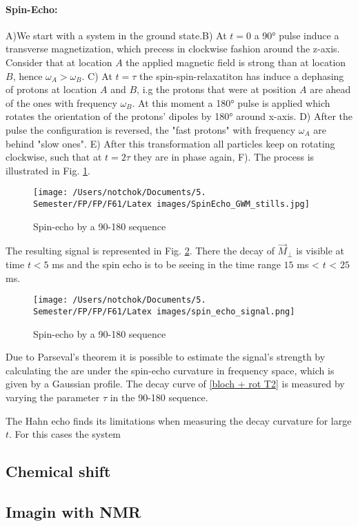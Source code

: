 \paragraph{Spin-Echo:}
A)We start with a system in the ground state.B) At $t = 0$ a 90° pulse induce a transverse magnetization, which precess in clockwise fashion around the z-axis. Consider that at location $A$ the applied magnetic field is strong than at location $B$, hence $\omega_A > \omega_B$. C) At $t = \tau$ the spin-spin-relaxatiton has induce a dephasing of protons at location $A$ and $B$, i.g the protons that were at position $A$ are ahead of the ones with frequency $\omega_B$. At this moment a 180° pulse is applied which rotates the orientation of the protons' dipoles by 180° around x-axis. D) After the pulse the configuration is reversed, the "fast protons" with frequency $\omega_A$ are behind "slow ones". E) After this transformation all particles keep on rotating clockwise, such that at $t = 2\tau$ they are in phase again, F). The process is illustrated in Fig. \ref{fig: spin-echo}. 
\begin{figure}[!htbp]
 \begin{center}
  \texttt{[image: /Users/notchok/Documents/5. Semester/FP/FP/F61/Latex images/SpinEcho\_GWM\_stills.jpg]}
  \caption[]{Spin-echo by a 90-180 sequence  \footnotemark}
    \label{fig: spin-echo}
 \end{center}
\end{figure}
The resulting signal is represented in Fig. \ref{fig: spin-echo signal}. There the decay of $\vec{M}_\perp$ is visible at time $t<5$ ms and the spin echo is to be seeing in the time range $15$ ms < $t$ < $25$ ms.
\begin{figure}[!htbp]
 \begin{center}
  \texttt{[image: /Users/notchok/Documents/5. Semester/FP/FP/F61/Latex images/spin\_echo\_signal.png]}
  \caption[]{Spin-echo by a 90-180 sequence  \footnotemark}
    \label{fig: spin-echo signal}
 \end{center}
\end{figure}
Due to Parseval's theorem it is possible to estimate the signal's strength by calculating the are under the spin-echo curvature in frequency space, which is given by a Gaussian profile. The decay curve of \ref{bloch + rot T2} is measured by varying the parameter $\tau$ in the 90-180 sequence.

The Hahn echo finds its limitations when measuring the decay curvature for large $t$. For this cases the system 
\subsection{Chemical shift}
\subsection{Imagin with NMR}
